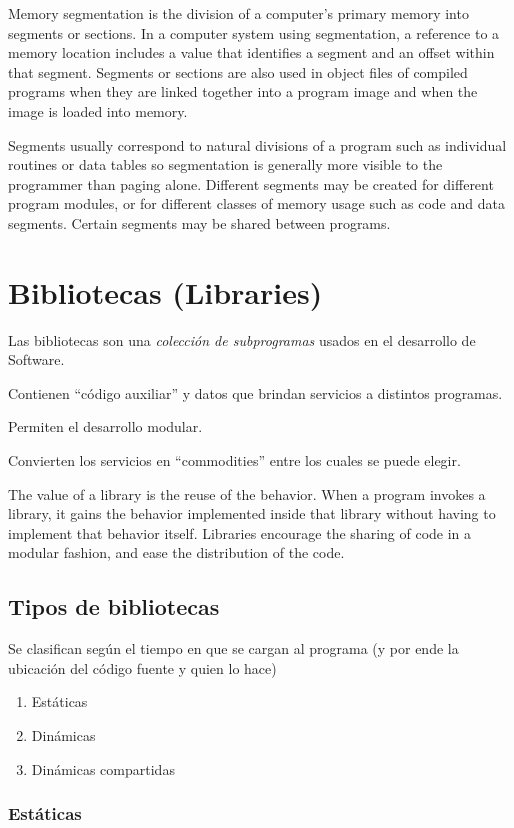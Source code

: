 \documentclass[a4paper, twoside]{article}
\begin{document}
Memory segmentation is the division of a computer's primary memory into
segments or sections.
In a computer system using segmentation, a reference to a memory location
includes a value that identifies a segment and an offset within that segment.
Segments or sections are also used in object files of compiled programs when
they are linked together into a program image and when the image is loaded into
memory.

Segments usually correspond to natural divisions of a program such as
individual routines or data tables so segmentation is generally more visible to
the programmer than paging alone.
Different segments may be created for different program modules, or for
different classes of memory usage such as code and data segments.
Certain segments may be shared between programs.

\newpage
\section{Bibliotecas (Libraries)}

Las bibliotecas son una \emph{colección de subprogramas} usados en el
desarrollo de Software.

Contienen ``código auxiliar'' y datos que brindan servicios a distintos
programas.

Permiten el desarrollo modular.

Convierten los servicios en ``commodities'' entre los cuales se puede elegir.

The value of a library is the reuse of the behavior.
When a program invokes a library, it gains the behavior implemented inside that
library without having to implement that behavior itself.
Libraries encourage the sharing of code in a modular fashion, and ease the
distribution of the code.

\subsection{Tipos de bibliotecas}

Se clasifican según el tiempo en que se cargan al programa (y por ende la
ubicación del código fuente y quien lo hace)
\begin{enumerate}
  \item Estáticas
  \item Dinámicas
  \item Dinámicas compartidas
\end{enumerate}

\subsubsection{Estáticas}
\end{document}
